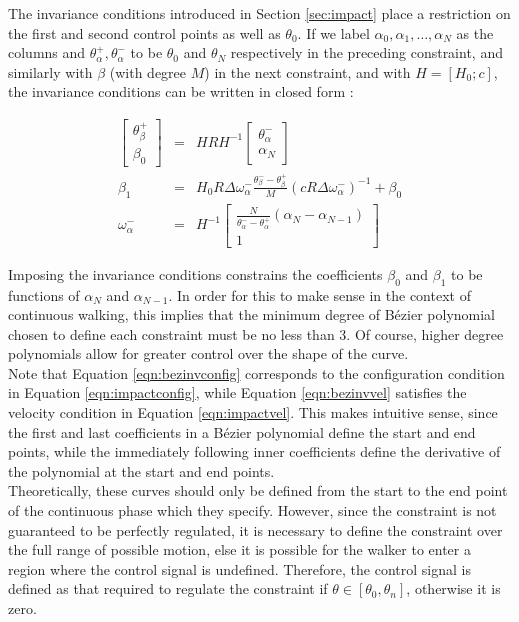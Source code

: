 The invariance conditions introduced in Section \ref{sec:impact} place a restriction on the first and second control points as well as $\theta_0$. If we label $\alpha_0, \alpha_1, \ldots, \alpha_N$ as the columns and $\theta_\alpha^+, \theta_\alpha^-$ to be $\theta_0$ and $\theta_N$ respectively in the preceding constraint, and similarly with $\beta$ (with degree $M$) in the next constraint, and with $H = [H_0; c]$, the invariance conditions can be written in closed form \cite{westervelt2007feedback}:

\begin{eqnarray}
	\begin{bmatrix}
	\theta_\beta^+ \\ \beta_0
	\end{bmatrix}
	&=& HRH^{-1} \begin{bmatrix}
		\theta_\alpha^- \\ \alpha_N
	\end{bmatrix} \label{eqn:bezinvconfig} \\
	\beta_1 &=& H_0R\Delta\omega_\alpha^-\frac{\theta_\beta^- - \theta_\beta^+}{M}(cR\Delta\omega_\alpha^-)^{-1} + \beta_0 \label{eqn:bezinvvel} \\
	\omega_\alpha^- &=& H^{-1}\begin{bmatrix}
		\frac{N}{\theta_\alpha^- - \theta_\alpha^+}(\alpha_N - \alpha_{N-1}) \\ 1
	\end{bmatrix}
\end{eqnarray}

Imposing the invariance conditions constrains the coefficients $\beta_0$ and $\beta_1$ to be functions of $\alpha_N$ and $\alpha_{N-1}$. In order for this to make sense in the context of continuous walking, this implies that the minimum degree of Bézier polynomial chosen to define each constraint must be no less than 3. Of course, higher degree polynomials allow for greater control over the shape of the curve. \\

Note that Equation \ref{eqn:bezinvconfig} corresponds to the configuration condition in Equation \ref{eqn:impactconfig}, while Equation \ref{eqn:bezinvvel} satisfies the velocity condition in Equation \ref{eqn:impactvel}. This makes intuitive sense, since the first and last coefficients in a Bézier polynomial define the start and end points, while the immediately following inner coefficients define the derivative of the polynomial at the start and end points. \\

Theoretically, these curves should only be defined from the start to the end point of the continuous phase which they specify. However, since the constraint is not guaranteed to be perfectly regulated, it is necessary to define the constraint over the full range of possible motion, else it is possible for the walker to enter a region where the control signal is undefined. Therefore, the control signal is defined as that required to regulate the constraint if $\theta \in [\theta_0, \theta_n]$, otherwise it is zero.\\